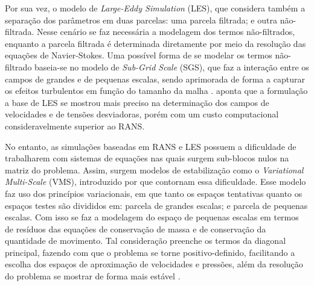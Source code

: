 Por sua vez, o modelo de \textit{Large-Eddy Simulation} (LES), que considera também a separação dos parâmetros em duas parcelas: uma parcela filtrada; e outra não-filtrada. Nesse cenário se faz necessária a modelagem dos termos não-filtrados, enquanto a parcela filtrada é determinada diretamente por meio da resolução das equações de Navier-Stokes. Uma possível forma de se modelar os termos não-filtrado baseia-se no modelo de \textit{Sub-Grid Scale} (SGS), que faz a interação entre os campos de grandes e de pequenas escalas, sendo aprimorada de forma a capturar os efeitos turbulentos em função do tamanho da malha \cite{ghosal1995basic,hughes2000large,moeng2015large}.
 aponta que a formulação a base de LES se mostrou mais preciso na determinação dos campos de velocidades e de tensões desviadoras, porém com um custo computacional consideravelmente superior ao RANS.

No entanto, as simulações baseadas em RANS e LES possuem a dificuldade de trabalharem com sistemas de equações nas quais surgem sub-blocos nulos na matriz do problema. Assim, surgem modelos de estabilização como o \textit{Variational Multi-Scale} (VMS), introduzido por  que contornam essa dificuldade. Esse modelo faz uso dos princípios variacionais, em que tanto os espaços tentativas quanto os espaços testes são divididos em: parcela de grandes escalas; e parcela de pequenas escalas. Com isso se faz a modelagem do espaço de pequenas escalas em termos de resíduos das equações de conservação de massa e de conservação da quantidade de movimento. Tal consideração preenche os termos da diagonal principal, fazendo com que o problema se torne positivo-definido, facilitando a escolha dos espaços de aproximação de velocidades e pressões, além da resolução do problema se mostrar de forma mais estável \cite{bazilevs2013computational,sondak2015new}.